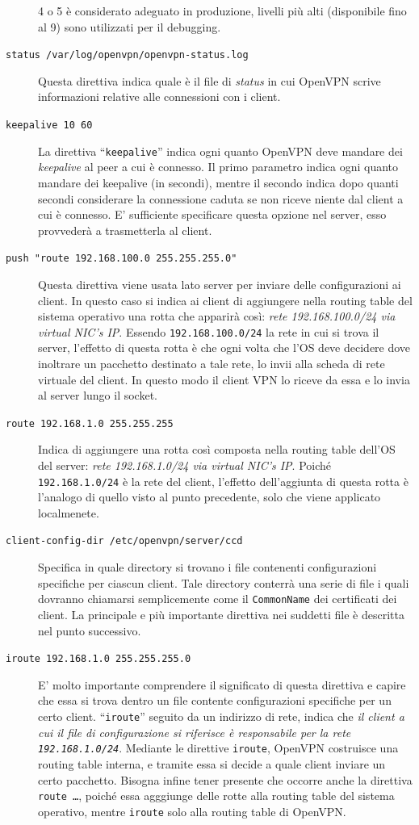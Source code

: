 \begin{description}
	4 o 5 è considerato adeguato in produzione, livelli più alti (disponibile fino al 9)
	sono utilizzati per il debugging.
	\item[\texttt{status /var/log/openvpn/openvpn-status.log}]Questa direttiva indica
	quale è il file di \textit{status} in cui OpenVPN scrive informazioni relative
	alle connessioni con i client.
	\item[\texttt{keepalive 10 60}]La direttiva ``\texttt{keepalive}'' indica ogni
	quanto OpenVPN deve mandare dei \textit{keepalive} al peer a cui è connesso.
	Il primo parametro indica ogni quanto mandare dei keepalive (in secondi), mentre
	il secondo indica dopo quanti secondi considerare la connessione caduta se non riceve
	niente dal client a cui è connesso. E' sufficiente specificare questa opzione
	nel server, esso provvederà a trasmetterla al client.
	\item[\texttt{push "route 192.168.100.0 255.255.255.0"}]Questa direttiva viene
	usata lato server per inviare delle configurazioni ai client. In questo caso si indica
	ai client di aggiungere nella routing table del sistema operativo una rotta che
	apparirà così: \textit{rete 192.168.100.0/24 via virtual NIC's IP}. Essendo
	\texttt{192.168.100.0/24} la rete in cui si trova il server, l'effetto di questa
	rotta è che ogni volta che l'OS deve decidere dove inoltrare un
	pacchetto destinato a tale rete, lo invii alla scheda di rete virtuale
	del client. In questo modo il client VPN lo riceve da essa e lo invia al server
	lungo il socket.
	\item[\texttt{route 192.168.1.0 255.255.255}]Indica di aggiungere una rotta
	così composta nella routing table dell'OS del server: \textit{rete 192.168.1.0/24
		via virtual NIC's IP}. Poiché \texttt{192.168.1.0/24} è la rete del client, l'effetto
	dell'aggiunta di questa rotta è l'analogo di quello visto al punto precedente, solo che
	viene applicato localmenete.
	\item[\texttt{client-config-dir /etc/openvpn/server/ccd}]Specifica in quale
	directory si trovano i file contenenti configurazioni specifiche per ciascun client.
	Tale directory conterrà una serie di file i quali dovranno chiamarsi semplicemente
	come il \texttt{CommonName} dei certificati dei client. La principale e più
	importante direttiva nei suddetti file è descritta nel punto successivo.
	\item[\texttt{iroute 192.168.1.0 255.255.255.0}]E' molto importante comprendere
	il significato di questa direttiva e capire che essa si trova dentro un file
	contente configurazioni specifiche per un certo client. ``\texttt{iroute}'' seguito
	da un indirizzo di rete, indica che \textit{il client a cui il file di configurazione
		si riferisce è responsabile per la rete \texttt{192.168.1.0/24}}. Mediante le
	direttive \texttt{iroute}, OpenVPN costruisce una routing table interna,
	e tramite essa si
	decide a quale client inviare un certo pacchetto. Bisogna infine tener presente
	che occorre anche la direttiva \texttt{route \ldots}, poiché essa agggiunge delle
	rotte alla routing table del sistema operativo, mentre \texttt{iroute} solo
	alla routing table di OpenVPN.
\end{description}

